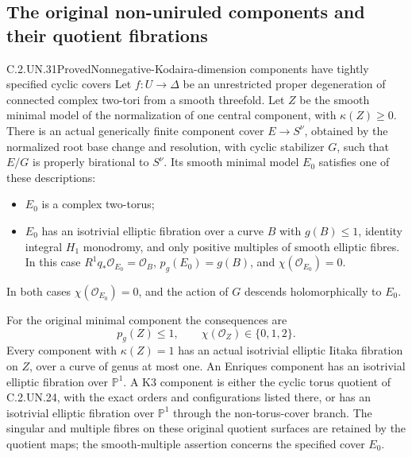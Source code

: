\subsection{The original non-uniruled components and their quotient fibrations}

\begin{statement}{C.2.UN.31}{Proved}{Nonnegative-Kodaira-dimension components have tightly specified cyclic covers}
Let $f:U\to\Delta$ be an unrestricted proper degeneration
of connected complex two-tori from a smooth threefold.
Let $Z$ be the smooth minimal model of the normalization
of one central component, with $\kappa(Z)\ge0$.
There is an actual generically finite component cover
$E\to S^\nu$, obtained by the normalized root base change
and resolution, with cyclic stabilizer $G$, such that
$E/G$ is properly birational to $S^\nu$. Its smooth
minimal model $E_0$ satisfies one of these descriptions:

\begin{itemize}
\item $E_0$ is a complex two-torus;
\item $E_0$ has an isotrivial elliptic fibration over a
curve $B$ with $g(B)\le1$, identity integral $H_1$
monodromy, and only positive multiples of smooth
elliptic fibres. In this case
$R^1q_*\mathcal O_{E_0}=\mathcal O_B$,
$p_g(E_0)=g(B)$, and $\chi(\mathcal O_{E_0})=0$.
\end{itemize}
In both cases $\chi(\mathcal O_{E_0})=0$, and the
action of $G$ descends holomorphically to $E_0$.

For the original minimal component the consequences are
\[
 p_g(Z)\le1,
 \qquad \chi(\mathcal O_Z)\in\{0,1,2\}.
                                                               \tag{C.CS.1}
\]
Every component with $\kappa(Z)=1$ has an actual
isotrivial elliptic Iitaka fibration on $Z$, over a
curve of genus at most one. An Enriques component
has an isotrivial elliptic fibration over $\mathbb P^1$.
A K3 component is either the cyclic torus quotient
of C.2.UN.24, with the exact orders and configurations
listed there, or has an isotrivial elliptic fibration
over $\mathbb P^1$ through the non-torus-cover branch.
The singular and multiple fibres on these original
quotient surfaces are retained by the quotient maps;
the smooth-multiple assertion concerns the specified
cover $E_0$.
\end{statement}

